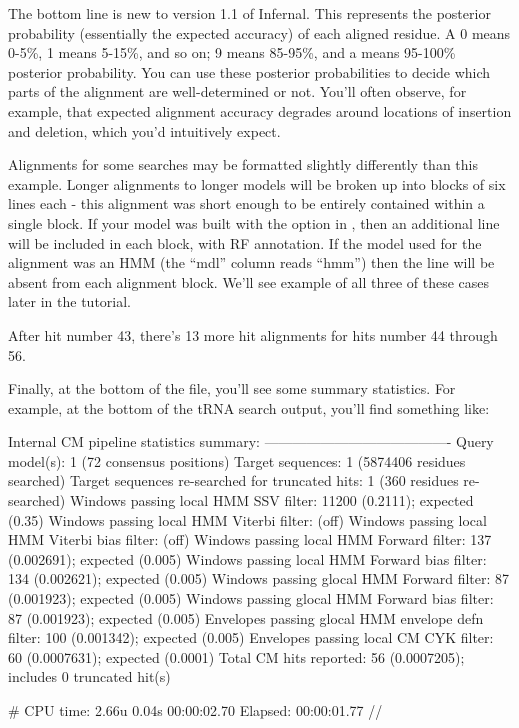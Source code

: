 The bottom line is new to version 1.1 of Infernal. This represents the
posterior probability (essentially the expected accuracy) of each
aligned residue. A 0 means 0-5\%, 1 means 5-15\%, and so on; 9 means
85-95\%, and a \otext{*} means 95-100\% posterior probability. You can
use these posterior probabilities to decide which parts of the
alignment are well-determined or not. You'll often observe, for
example, that expected alignment accuracy degrades around locations of
insertion and deletion, which you'd intuitively expect.

Alignments for some searches may be formatted slightly differently
than this example. Longer alignments to longer models will be broken
up into blocks of six lines each - this alignment was short enough to
be entirely contained within a single block.  If your model was built
with the  option in , then an additional
line will be included in each block, with RF annotation.  If the model
used for the alignment was an HMM (the ``mdl'' column reads ``hmm'')
then the  line will be absent from each alignment
block. We'll see example of all three of these cases later in the
tutorial.

After hit number 43, there's 13 more hit alignments for hits number 44
through 56. 

Finally, at the bottom of the file, you'll see some summary
statistics. For example, at the bottom of the tRNA search output,
you'll find something like:

\begin{sreoutput}
Internal CM pipeline statistics summary:
----------------------------------------
Query model(s):                                                  1  (72 consensus positions)
Target sequences:                                                1  (5874406 residues searched)
Target sequences re-searched for truncated hits:                 1  (360 residues re-searched)
Windows   passing  local HMM SSV           filter:           11200  (0.2111); expected (0.35)
Windows   passing  local HMM Viterbi       filter:                  (off)
Windows   passing  local HMM Viterbi  bias filter:                  (off)
Windows   passing  local HMM Forward       filter:             137  (0.002691); expected (0.005)
Windows   passing  local HMM Forward  bias filter:             134  (0.002621); expected (0.005)
Windows   passing glocal HMM Forward       filter:              87  (0.001923); expected (0.005)
Windows   passing glocal HMM Forward  bias filter:              87  (0.001923); expected (0.005)
Envelopes passing glocal HMM envelope defn filter:             100  (0.001342); expected (0.005)
Envelopes passing  local CM  CYK           filter:              60  (0.0007631); expected (0.0001)
Total CM hits reported:                                         56  (0.0007205); includes 0 truncated hit(s)

# CPU time: 2.66u 0.04s 00:00:02.70 Elapsed: 00:00:01.77
//
\end{sreoutput}

